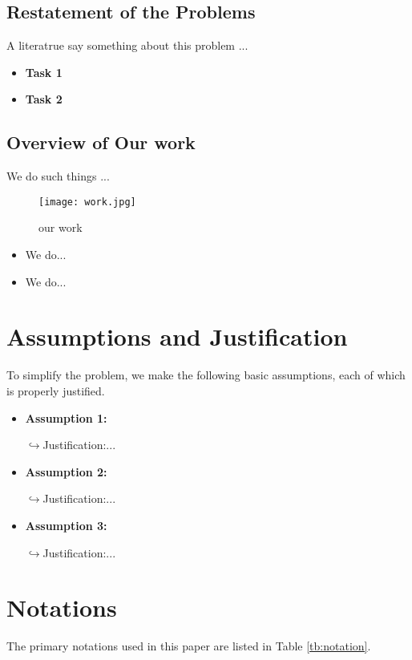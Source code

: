 \documentclass[12pt]{article}  %
\begin{document}
\subsection{Restatement of the Problems}
A literatrue\cite{1} say something about this problem ...

\begin{itemize}
	\item \textbf{Task 1}
	\item \textbf{Task 2}
\end{itemize}

\subsection{Overview of Our work}
We do such things ...

\begin{figure}[htbp]
	\centering
	\texttt{[image: work.jpg]}
	\caption{our work}\label{fig:work}
\end{figure}

\begin{itemize}
	\item We do...
	\item We do...
\end{itemize}


\section{Assumptions and Justification}
To simplify the problem, we make the following basic assumptions, each of which is properly justified.

\begin{itemize}
	\item \textbf{Assumption 1:}
	
	$\hookrightarrow$Justification:...\cite{1}
	\item \textbf{Assumption 2:}
	
	$\hookrightarrow$Justification:...\cite{2}
	\item \textbf{Assumption 3:}
	
	$\hookrightarrow$Justification:...\cite{3}
\end{itemize}


\section{Notations}
The primary notations used in this paper are listed in Table \ref{tb:notation}.
\end{document}
